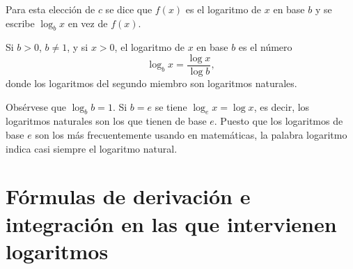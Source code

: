 Para esta elección de $c$ se dice que $f(x)$ es el logaritmo de $x$ en base $b$ y se escribe $\log_b x$ en vez de $f(x)$.

\begin{def.}
    Si $b>0$, $b\neq 1$, y si $x>0$, el logaritmo de $x$ en base $b$ es el número
    $$\log_b x = \dfrac{\log x}{\log b},$$
    donde los logaritmos del segundo miembro son logaritmos naturales.
\end{def.}

Obsérvese que $\log_b b = 1$. Si $b=e$ se tiene $\log_e x= \log x$, es decir, los logaritmos naturales son los que tienen de base $e$. Puesto que los logaritmos de base $e$ son los más frecuentemente usando en matemáticas, la palabra logaritmo indica casi siempre el logaritmo natural.


\section{Fórmulas de derivación e integración en las que intervienen logaritmos}
